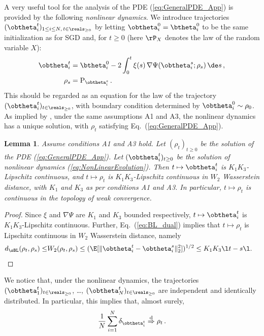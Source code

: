 \documentclass[11pt]{article}
\newtheorem{lemma}{Lemma}
\begin{document}
A very useful tool for the analysis of the PDE  (\ref{eq:GeneralPDE_App}) is provided by the following \emph{nonlinear dynamics}.
We introduce trajectories $(\obtheta^t_i)_{1\le i\le N, \, t\in\reals_{\ge 0}}$ by letting $\obtheta_i^0 = \btheta_i^0$ to be the same initialization as for SGD
and, for $t\ge 0$ (here $\rP_X$ denotes the law of the random variable $X$):
%
\begin{align}
%
\obtheta^t_i &=\btheta^0_i-2\int_{0}^t\xi(s)\, \nabla\Psi(\obtheta_i^s;\rho_s)\, \de s\, ,\label{eq:NonLinearEvolution}\\
\rho_s & = {\rm P}_{\obtheta^s_i}\, .
%
\end{align}
%
This should be regarded as an equation for the law of the trajectory $(\obtheta_i^t)_{t\in\reals_{\ge 0}}$, with boundary condition determined by  $\obtheta_i^0\sim \rho_0$. 
As implied by \cite[Theorem 1.1]{sznitman1991topics}, under the same assumptions {\sf A1} and {\sf A3}, the nonlinear dynamics
 has a unique solution, with $\rho_t$ satisfying Eq.~(\ref{eq:GeneralPDE_App}).


\begin{lemma}\label{lemma:Lipschitz_continuity_of_rho_and_theta}
Assume conditions {\sf A1} and {\sf A3} hold. Let $(\rho_t)_{t \ge 0}$ be the solution of the PDE (\ref{eq:GeneralPDE_App}). Let $(\obtheta_i^t)_{t\ge 0}$ be the solution of nonlinear dynamics (\ref{eq:NonLinearEvolution}). Then $t\mapsto\obtheta^t_i$ is $K_1 K_3$-Lipschitz continuous, and $t\mapsto \rho_t$ is $K_1 K_3$-Lipschitz continuous in $W_2$ Wasserstein distance, with $K_1$ and $K_3$ as per conditions {\sf A1} and {\sf A3}. In particular, $t\mapsto\rho_t$ is continuous in the topology of weak convergence. 
\end{lemma}

\begin{proof}

Since $\xi$ and $\nabla\Psi$ are $K_1$ and $K_3$ bounded respectively, $t\mapsto\obtheta^t_i$ is $K_1 K_3$-Lipschitz continuous. 
Further, Eq.~(\ref{eq:BL_dual}) implies that
$t\mapsto \rho_t$ is Lipschitz continuous in $W_2$ Wasserstein distance, namely 
\begin{align}
d_{\sBL}(\rho_t,\rho_s)\le& W_2(\rho_t,\rho_s) \le (\E[\| \obtheta^t_i - \obtheta^s_i \|_2^2])^{1/2} \le K_1 K_3 \l t-s\l. 
\end{align}
\end{proof}


We notice that, under the nonlinear dynamics, the trajectories $(\obtheta_1^t)_{t\in\reals_{\ge 0}}$, \dots, $(\obtheta_N^t)_{t\in\reals_{\ge 0}}$
are independent and identically distributed. In particular, this implies  that, almost surely,
%
\begin{align}
%
\frac{1}{N}\sum_{i=1}^N\delta_{\obtheta^t_i}\stackrel{{\rm d}}{\Rightarrow} \rho_t\, .
%
\end{align}
%
\end{document}

